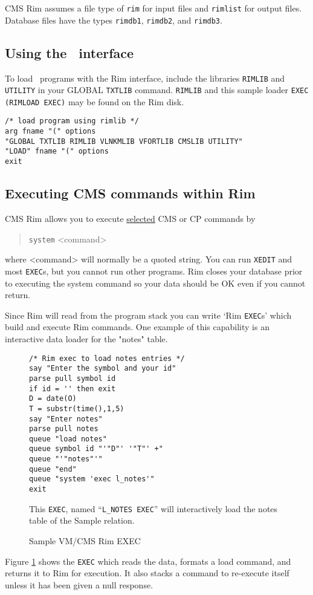 \documentclass[11pt,a4paper]{report}
\begin{document}
CMS Rim assumes a file type  of \verb!rim! for input files and
\verb!rimlist! for output files.
Database files have the types \verb!rimdb1!, \verb!rimdb2!, and \verb!rimdb3!.
 
\subsection{Using the \Fortran\ interface}
%
To load \Fortran\ programs with the Rim interface, include the
libraries \verb!RIMLIB! and \verb!UTILITY!
in your GLOBAL \verb!TXTLIB! command.
\verb!RIMLIB! and this sample loader \verb!EXEC (RIMLOAD EXEC)! may be
found on the Rim disk.
 
\begin{verbatim}
/* load program using rimlib */
arg fname "(" options
"GLOBAL TXTLIB RIMLIB VLNKMLIB VFORTLIB CMSLIB UTILITY"
"LOAD" fname "(" options
exit
\end{verbatim}
 
\subsection{Executing CMS commands within Rim}
%
CMS Rim allows you to execute \underline{selected} CMS or
CP commands by
\begin{verse}
  \verb!system! <command>
\end{verse}
where <command> will normally be a quoted string.
You can run \verb!XEDIT! and most \verb!EXEC!s, but you cannot run other
programs.  Rim closes your database prior to executing
the system command so your data should be OK even if you
cannot return.
 
\medskip
 
Since Rim will read from the program stack you can write
`Rim \verb!EXEC!s' which build and execute Rim commands.
One example of this capability is an interactive
data loader for the "notes" table.
%
\begin{figure}[htp]
\narrower
\begin{verbatim}
/* Rim exec to load notes entries */
say "Enter the symbol and your id"
parse pull symbol id
if id = '' then exit
D = date(O)
T = substr(time(),1,5)
say "Enter notes"
parse pull notes
queue "load notes"
queue symbol id "'"D"' '"T"' +"
queue "'"notes"'"
queue "end"
queue "system 'exec l_notes'"
exit
\end{verbatim}
\caption{Sample VM/CMS Rim EXEC}
{This {\tt EXEC}, named ``{\tt L\_NOTES EXEC}'' will
interactively load the notes table of the Sample relation.\par}
\label{CMS-exec}
\end{figure}
%
Figure \ref{CMS-exec} shows the \verb!EXEC! which reads the data,    formats
a load command, and returns it to Rim for execution. It also
stacks a command to re-execute itself unless it has been given
a null response.
 
\end{document}
